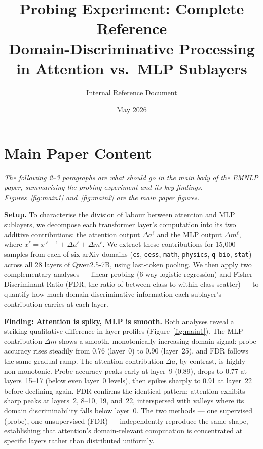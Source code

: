 \documentclass[11pt]{article}
\title{Probing Experiment: Complete Reference\\
{\normalsize Domain-Discriminative Processing in Attention vs.\ MLP Sublayers}}
\author{Internal Reference Document}
\date{May 2026}
\newcommand{\attn}{\Delta a}
\newcommand{\mlp}{\Delta m}
\begin{document}
\maketitle
\tableofcontents
\newpage

\section{Main Paper Content}
\label{sec:main}

\textit{The following 2--3 paragraphs are what should go in the main body of the EMNLP paper, summarising the probing experiment and its key findings. Figures~\ref{fig:main1} and~\ref{fig:main2} are the main paper figures.}

\bigskip

\noindent\textbf{Setup.}\quad
To characterise the division of labour between attention and MLP sublayers, we decompose each transformer layer's computation into its two additive contributions: the attention output $\attn^\ell$ and the MLP output $\mlp^\ell$, where $x^{\ell} = x^{\ell-1} + \attn^\ell + \mlp^\ell$. We extract these contributions for 15{,}000 samples from each of six arXiv domains (\texttt{cs}, \texttt{eess}, \texttt{math}, \texttt{physics}, \texttt{q-bio}, \texttt{stat}) across all 28 layers of Qwen2.5-7B, using last-token pooling. We then apply two complementary analyses --- linear probing (6-way logistic regression) and Fisher Discriminant Ratio (FDR, the ratio of between-class to within-class scatter) --- to quantify how much domain-discriminative information each sublayer's contribution carries at each layer.

\noindent\textbf{Finding: Attention is spiky, MLP is smooth.}\quad
Both analyses reveal a striking qualitative difference in layer profiles (Figure~\ref{fig:main1}). The MLP contribution $\mlp$ shows a smooth, monotonically increasing domain signal: probe accuracy rises steadily from 0.76 (layer~0) to 0.90 (layer~25), and FDR follows the same gradual ramp. The attention contribution $\attn$, by contrast, is highly non-monotonic. Probe accuracy peaks early at layer~9 (0.89), drops to 0.77 at layers~15--17 (below even layer~0 levels), then spikes sharply to 0.91 at layer~22 before declining again. FDR confirms the identical pattern: attention exhibits sharp peaks at layers~2, 8--10, 19, and~22, interspersed with valleys where its domain discriminability falls below layer~0. The two methods --- one supervised (probe), one unsupervised (FDR) --- independently reproduce the same shape, establishing that attention's domain-relevant computation is concentrated at specific layers rather than distributed uniformly.
\end{document}
